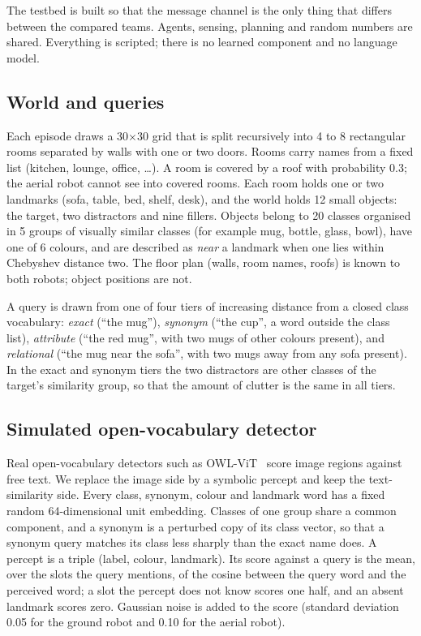 The testbed is built so that the message channel is the only thing that differs between the compared teams. Agents, sensing, planning and random numbers are shared. Everything is scripted; there is no learned component and no language model.

\subsection{World and queries}
Each episode draws a 30$\times$30 grid that is split recursively into 4 to 8 rectangular rooms separated by walls with one or two doors. Rooms carry names from a fixed list (kitchen, lounge, office, \dots). A room is covered by a roof with probability 0.3; the aerial robot cannot see into covered rooms. Each room holds one or two landmarks (sofa, table, bed, shelf, desk), and the world holds 12 small objects: the target, two distractors and nine fillers. Objects belong to 20 classes organised in 5 groups of visually similar classes (for example mug, bottle, glass, bowl), have one of 6 colours, and are described as \emph{near} a landmark when one lies within Chebyshev distance two. The floor plan (walls, room names, roofs) is known to both robots; object positions are not.

A query is drawn from one of four tiers of increasing distance from a closed class vocabulary:
\emph{exact} (``the mug''), \emph{synonym} (``the cup'', a word outside the class list),
\emph{attribute} (``the red mug'', with two mugs of other colours present), and
\emph{relational} (``the mug near the sofa'', with two mugs away from any sofa present).
In the exact and synonym tiers the two distractors are other classes of the target's similarity group, so that the amount of clutter is the same in all tiers.

\subsection{Simulated open-vocabulary detector}
Real open-vocabulary detectors such as OWL-ViT~\cite{minderer2022simple} score image regions against free text. We replace the image side by a symbolic percept and keep the text-similarity side. Every class, synonym, colour and landmark word has a fixed random 64-dimensional unit embedding. Classes of one group share a common component, and a synonym is a perturbed copy of its class vector, so that a synonym query matches its class less sharply than the exact name does. A percept is a triple (label, colour, landmark). Its score against a query is the mean, over the slots the query mentions, of the cosine between the query word and the perceived word; a slot the percept does not know scores one half, and an absent landmark scores zero. Gaussian noise is added to the score (standard deviation 0.05 for the ground robot and 0.10 for the aerial robot).

